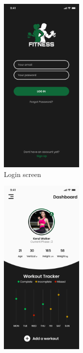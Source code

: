 \begin{figure}[H]
    \centering
    \begin{minipage}{0.5\textwidth}
        \begin{subfigure}{\textwidth}
            \centering
            \includegraphics[width=0.45\textwidth]{graphics/prototype/login-page.png}
            \caption{Login screen}
            \label{fig:prototype-login}
        \end{subfigure}
    \end{minipage}%
    \begin{minipage}{0.5\textwidth}
        \begin{subfigure}{\textwidth}
            \centering
            \includegraphics[width=0.45\textwidth]{graphics/prototype/dashboard.png}

\end{subfigure}
\end{minipage}
\end{figure}
